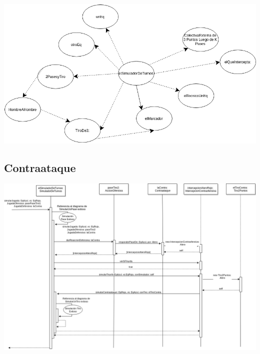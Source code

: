 \includegraphics[width=\textwidth]{imgs/colectivaExternaDe3Objetos.png}

\subsection{Contraataque}
\includegraphics[width=\textwidth]{imgs/ContraataqueSecuencia.png}


